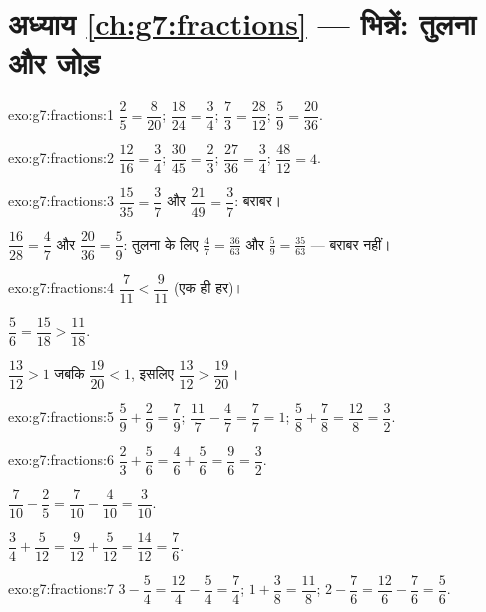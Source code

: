 \section*{अध्याय \ref{ch:g7:fractions} --- भिन्नें: तुलना और जोड़}

\begin{solution}{exo:g7:fractions:1}
$\dfrac{2}{5} = \dfrac{8}{20}$; \quad
$\dfrac{18}{24} = \dfrac{3}{4}$; \quad
$\dfrac{7}{3} = \dfrac{28}{12}$; \quad
$\dfrac{5}{9} = \dfrac{20}{36}$.
\end{solution}

\begin{solution}{exo:g7:fractions:2}
$\dfrac{12}{16} = \dfrac34$; \quad
$\dfrac{30}{45} = \dfrac23$; \quad
$\dfrac{27}{36} = \dfrac34$; \quad
$\dfrac{48}{12} = 4$.
\end{solution}

\begin{solution}{exo:g7:fractions:3}
$\dfrac{15}{35} = \dfrac37$ और $\dfrac{21}{49} = \dfrac37$: बराबर।

$\dfrac{16}{28} = \dfrac47$ और $\dfrac{20}{36} = \dfrac59$: तुलना के
लिए $\frac47 = \frac{36}{63}$ और $\frac59 = \frac{35}{63}$ ---
बराबर नहीं।
\end{solution}

\begin{solution}{exo:g7:fractions:4}
$\dfrac{7}{11} < \dfrac{9}{11}$ (एक ही हर)।

$\dfrac56 = \dfrac{15}{18} > \dfrac{11}{18}$.

$\dfrac{13}{12} > 1$ जबकि $\dfrac{19}{20} < 1$, इसलिए
$\dfrac{13}{12} > \dfrac{19}{20}$।
\end{solution}

\begin{solution}{exo:g7:fractions:5}
$\dfrac59 + \dfrac29 = \dfrac79$; \quad
$\dfrac{11}{7} - \dfrac47 = \dfrac77 = 1$; \quad
$\dfrac58 + \dfrac78 = \dfrac{12}{8} = \dfrac32$.
\end{solution}

\begin{solution}{exo:g7:fractions:6}
$\dfrac23 + \dfrac56 = \dfrac46 + \dfrac56 = \dfrac96 = \dfrac32$.

$\dfrac{7}{10} - \dfrac25 = \dfrac{7}{10} - \dfrac{4}{10} =
\dfrac{3}{10}$.

$\dfrac34 + \dfrac{5}{12} = \dfrac{9}{12} + \dfrac{5}{12} =
\dfrac{14}{12} = \dfrac76$.
\end{solution}

\begin{solution}{exo:g7:fractions:7}
$3 - \dfrac54 = \dfrac{12}{4} - \dfrac54 = \dfrac74$; \quad
$1 + \dfrac38 = \dfrac{11}{8}$; \quad
$2 - \dfrac76 = \dfrac{12}{6} - \dfrac76 = \dfrac56$.
\end{solution}

